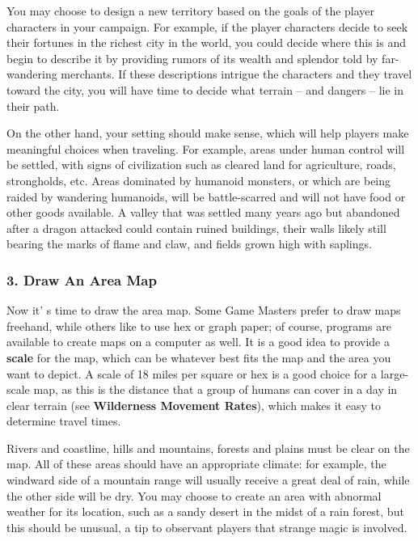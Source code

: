 \documentclass[a4paper,twoside,openany,10pt]{book}
\begin{document}
\begin{multicols}{2}
You may choose to design a new territory based on the goals of the player characters in your campaign. For example, if the player characters decide to seek their fortunes in the richest city in the world, you could decide where this is and begin to describe it by providing rumors of its wealth and splendor told by far-wandering merchants. If these descriptions intrigue the characters and they travel toward the city, you will have time to decide what terrain -- and dangers -- lie in their path.

On the other hand, your setting should make sense, which will help players make meaningful choices when traveling. For example, areas under human control will be settled, with signs of civilization such as cleared land for agriculture, roads, strongholds, etc. Areas dominated by humanoid monsters, or which are being raided by wandering humanoids, will be battle-scarred and will not have food or other goods available. A valley that was settled many years ago but abandoned after a dragon attacked could contain ruined buildings, their walls likely still bearing the marks of flame and claw, and fields grown high with saplings.

\subsubsection{3. Draw An Area Map}\label{draw-an-area-map}

Now it' s time to draw the area map. Some Game Masters prefer to draw maps freehand, while others like to use hex or graph paper; of course, programs are available to create maps on a computer as well. It is a good idea to provide a \textbf{scale} for the map, which can be whatever best fits the map and the area you want to depict. A scale of 18 miles per square or hex is a good choice for a large-scale map, as this is the distance that a group of humans can cover in a day in clear terrain (see \textbf{Wilderness Movement Rates}), which makes it easy to determine travel times.

Rivers and coastline, hills and mountains, forests and plains must be clear on the map. All of these areas should have an appropriate climate: for example, the windward side of a mountain range will usually receive a great deal of rain, while the other side will be dry. You may choose to create an area with abnormal weather for its location, such as a sandy desert in the midst of a rain forest, but this should be unusual, a tip to observant players that strange magic is involved.


\end{multicols}
\end{document}
